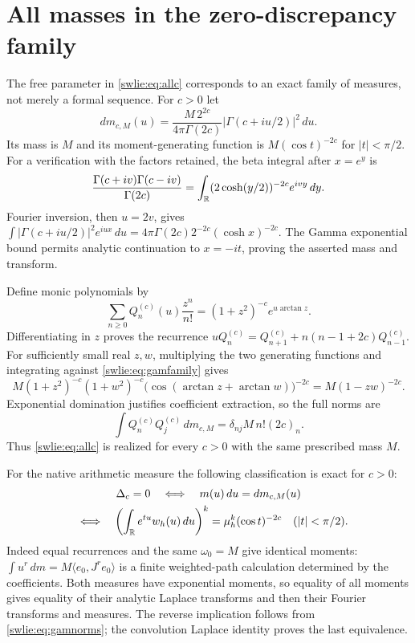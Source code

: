 \documentclass[11pt]{article}
\begin{document}
\section{All masses in the zero-discrepancy family}

The free parameter in \eqref{swlie:eq:allc} corresponds to an exact
family of measures, not merely a formal sequence. For $c>0$ let
\begin{equation}\label{swlie:eq:gamfamily}
 dm_{c,M}(u)=
 \frac{M\,2^{2c}}{4\pi\Gamma(2c)}
       |\Gamma(c+iu/2)|^2\,du .
\end{equation}
Its mass is $M$ and its moment-generating function is
$M(\cos t)^{-2c}$ for $|t|<\pi/2$.
For a verification with the factors retained, the beta integral
after $x=e^y$ is
\[
 \frac{\Gamma(c+iv)\Gamma(c-iv)}{\Gamma(2c)}
  =\int_\mathbb R (2\cosh(y/2))^{-2c}e^{ivy}\,dy .
\]
Fourier inversion, then $u=2v$, gives
$\int|\Gamma(c+iu/2)|^2e^{iux}\,du
 =4\pi\Gamma(2c)2^{-2c}(\cosh x)^{-2c}$.
The Gamma exponential bound permits analytic continuation
to $x=-it$, proving the asserted mass and transform.

Define monic polynomials by
\begin{equation}\label{swlie:eq:genfamily}
 \sum_{n\geq0}Q_n^{(c)}(u)\frac{z^n}{n!}
       =(1+z^2)^{-c}e^{u\arctan z}.
\end{equation}
Differentiating in $z$ proves the recurrence
$uQ_n^{(c)}=Q_{n+1}^{(c)}+n(n-1+2c)Q_{n-1}^{(c)}$.
For sufficiently small real $z,w$, multiplying the two
generating functions and integrating against
\eqref{swlie:eq:gamfamily} gives
\[
 M(1+z^2)^{-c}(1+w^2)^{-c}
       \bigl(\cos(\arctan z+\arctan w)\bigr)^{-2c}
       =M(1-zw)^{-2c}.
\]
Exponential domination justifies coefficient extraction,
so the full norms are
\begin{equation}\label{swlie:eq:gamnorms}
 \int Q_n^{(c)}Q_j^{(c)}\,dm_{c,M}
       =\delta_{nj}M\,n!(2c)_n .
\end{equation}
Thus \eqref{swlie:eq:allc} is realized for every $c>0$ with the
same prescribed mass $M$.

For the native arithmetic measure the following classification
is exact for $c>0$:
\begin{equation}\label{swlie:eq:exacttest}
 \begin{gathered}
 \Delta_c=0
 \quad\Longleftrightarrow\quad m(u)\,du=dm_{c,M}(u)\\
 \quad\Longleftrightarrow\quad
 \left(\int_\mathbb R e^{tu}w_h(u)\,du\right)^k
          =\mu_h^k(\cos t)^{-2c}\quad(|t|<\pi/2).
 \end{gathered}
\end{equation}
Indeed equal recurrences and the same $\omega_0=M$ give
identical moments:
$\int u^r\,dm=M\langle e_0,J^re_0\rangle$ is a finite
weighted-path calculation determined by the coefficients.
Both measures have exponential moments, so equality of
all moments gives equality of their analytic Laplace
transforms and then their Fourier transforms and measures.
The reverse implication follows from \eqref{swlie:eq:gamnorms};
the convolution Laplace identity proves the last equivalence.
\end{document}

